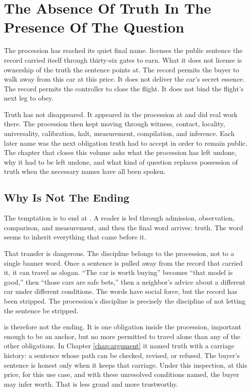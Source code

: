\chapter{The Absence Of Truth In The Presence Of The Question}
\label{chap:absence-of-truth}


The procession has reached its quiet final name.  licenses
the public sentence the record carried itself through thirty-six gates to
earn. What it does not license is ownership of the truth the sentence
points at. The record permits the buyer to walk away from this car at
this price. It does not deliver the car's secret essence. The record
permits the controller to close the flight. It does not bind the flight's
next leg to obey.

Truth has not disappeared. It appeared in the procession at 
and did real work there. The procession then kept moving through witness,
contact, locality, universality, calibration, halt, measurement,
compilation, and inference. Each later name was the next obligation truth
had to accept in order to remain public. The chapter that closes this
volume asks what the procession has left undone, why it had to be left
undone, and what kind of question replaces possession of truth when the
necessary names have all been spoken.

\section{Why  Is Not The Ending}
\label{se:why-truth-is-not-the-ending}

The temptation is to end at . A reader is led through
admission, observation, comparison, and measurement, and then the final
word arrives: truth. The word seems to inherit everything that came
before it.

That transfer is dangerous. The discipline belongs to the procession,
not to a single banner word. Once a sentence is pulled away from the
record that carried it, it can travel as slogan. ``The car is worth
buying'' becomes ``that model is good,'' then ``those cars are safe
bets,'' then a neighbor's advice about a different car under different
conditions. The words have social force, but the record has been
stripped. The procession's discipline is precisely the discipline of
not letting the sentence be stripped.

 is therefore not the ending. It is one obligation inside
the procession, important enough to be an anchor, but no more permitted
to travel alone than any of the other obligations. In Chapter
\ref{chap:argument} it named truth with a carriage history: a sentence
whose path can be checked, revised, or refused. The buyer's sentence is
honest only when it keeps that carriage. Under this inspection, at
this price, for this use case, and with these unresolved conditions
named, the buyer may infer worth. That is less grand and more
trustworthy.

